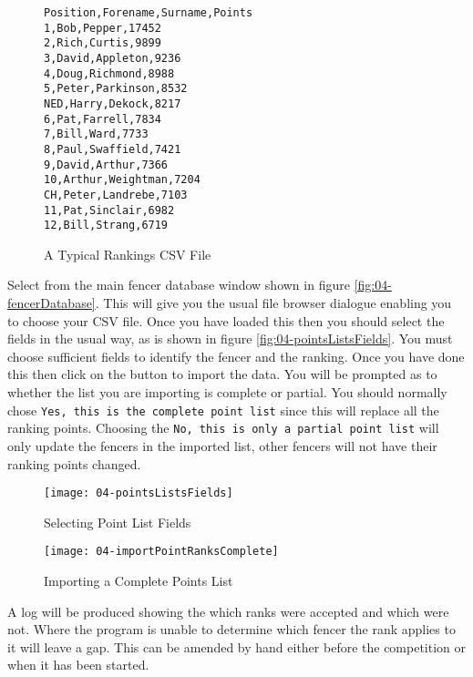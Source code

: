 \documentclass[a4paper,11pt]{memoir}
\begin{document}
\begin{figure}[!ht]
 \begin{verbatim}
Position,Forename,Surname,Points
1,Bob,Pepper,17452
2,Rich,Curtis,9899
3,David,Appleton,9236
4,Doug,Richmond,8988
5,Peter,Parkinson,8532
NED,Harry,Dekock,8217
6,Pat,Farrell,7834
7,Bill,Ward,7733
8,Paul,Swaffield,7421
9,David,Arthur,7366
10,Arthur,Weightman,7204
CH,Peter,Landrebe,7103
11,Pat,Sinclair,6982
12,Bill,Strang,6719 
 \end{verbatim}
 \caption{A Typical Rankings CSV File} \label{fig:04-rankingsCSV}
\end{figure}

Select  from the main fencer database window shown in figure \ref{fig:04-fencerDatabase}. This will give you the usual file browser dialogue enabling you to choose your CSV file. Once you have loaded this then you should select the fields  in the usual way, as is shown in figure \ref{fig:04-pointsListsFields}. You must choose sufficient fields to identify the fencer and the ranking. Once you have done this then click on the  button to import the data. You will be prompted as to whether the list you are importing is complete or partial. You should normally chose \texttt{Yes, this is the complete point list} since this will replace all the ranking points. Choosing the \texttt{No, this is only a partial point list} will only update the fencers in the imported list, other fencers will not have their ranking points changed.

\begin{figure}
 \centering
 \begin{minipage}{0.4\textwidth}
 \centering
 \texttt{[image: 04-pointsListsFields]}
 \caption{Selecting Point List Fields} \label{fig:04-pointsListsFields}  
 \end{minipage}
 \hfill
 \begin{minipage}{0.4\textwidth}
 \centering
 \texttt{[image: 04-importPointRanksComplete]}
 \caption{Importing a Complete Points List} \label{fig:04-importPointRanksComplete}    
 \end{minipage}
\end{figure}

A log will be produced showing the which ranks were accepted and which were not. Where the program is unable to determine which fencer the rank applies to it will leave a gap. This can be amended by hand either before the competition or when it has been started. 
\end{document}
